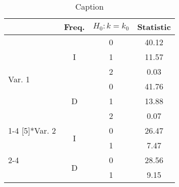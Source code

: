 \documentclass[a4paper,12pt]{article}
\begin{document}
	\begin{footnotesize}
		\begin{table}[tbph]
			\centering
			\caption{Caption} \label{tab:extabltx}
			\begin{threeparttable}
				\begin{tabular}{lccc}
					\toprule
					& Freq. & \(H_{0}: k = k_{0}\) & Statistic \\
					\midrule
					\multirow{6}[5]{*}{Var. 1} & \multirow{3}{*}{I} & 0 & 40.12 \\
					& & 1 & 11.57 \\
					& & 2 &  0.03 \\
					\cmidrule(lr){2-4}
					& \multirow{3}{*}{D} & 0 & 41.76 \\
					& & 1 & 13.88 \\
					& & 2 &  0.07 \\
					\cmidrule(lr){1-4}
					\multirow{4}[5]{*}{Var. 2} & \multirow{2}{*}{I} & 0 & 26.47 \\
					& & 1 &  7.47 \\
					\cmidrule(lr){2-4}
					& \multirow{2}{*}{D} & 0 & 28.56 \\
					& & 1 &  9.15 \\
					\bottomrule
				\end{tabular}
			\end{threeparttable}
		\end{table}
	\end{footnotesize}
\end{document}
